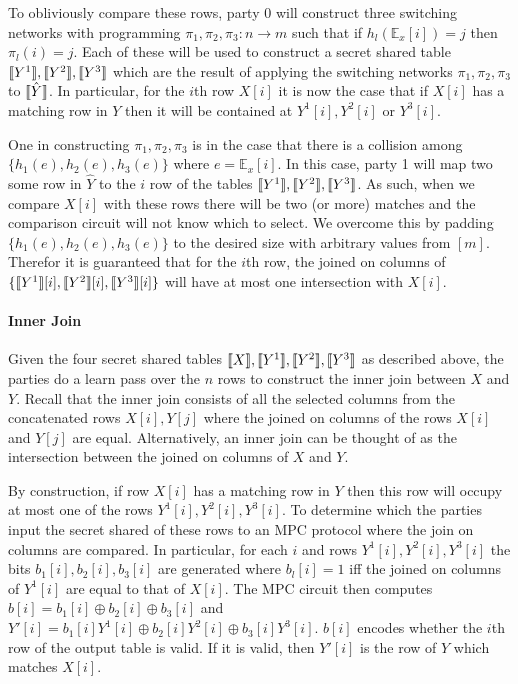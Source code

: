 To obliviously compare these rows, party 0 will construct three switching networks with programming $\pi_1,\pi_2,\pi_3 : n\rightarrow m$ such that if $h_l(\mathbb{E}_x[i])=j$ then $\pi_l(i)=j$. Each of these will be used to construct a secret shared table $\llbracket Y^1\rrbracket,\llbracket Y^2\rrbracket,\llbracket Y^3\rrbracket$ which are the result of applying the switching networks $\pi_1,\pi_2,\pi_3$ to $\llbracket \hat Y\rrbracket$. In particular, for the $i$th row $X[i]$ it is now the case that if $X[i]$ has a matching row in $Y$ then it will be contained at  $Y^1[i],Y^2[i]$ or ${Y^3}[i]$. 

One in constructing $\pi_1,\pi_2,\pi_3$ is in the case that there is a collision among $\{h_1(e),h_2(e), h_3(e)\}$ where $e= \mathbb{E}_x[i]$. In this case, party 1 will map two some row in $\hat Y$ to the $i$ row of the tables $\llbracket Y^1\rrbracket,\llbracket Y^2\rrbracket,\llbracket Y^3\rrbracket$. As such, when we compare $X[i]$ with these rows there will be two (or more) matches and the comparison circuit will not know which to select. We overcome this by padding $\{h_1(e),h_2(e), h_3(e)\}$ to the desired size with arbitrary values from $[m]$. Therefor it is guaranteed that for the $i$th row, the joined on columns of $\{\llbracket Y^1\rrbracket[i],\llbracket Y^2\rrbracket[i],\llbracket Y^3\rrbracket[i]\}$ will  have at most one intersection with $X[i]$.


\paragraph{Inner Join}


Given the four secret shared tables $\llbracket X\rrbracket,\llbracket Y^1\rrbracket,\llbracket Y^2\rrbracket,\llbracket Y^3\rrbracket$ as described above, the parties do a learn pass over the $n$ rows to construct the inner join between $X$ and $Y$. Recall that the inner join consists of all the selected columns from the concatenated rows $X[i],Y[j]$ where  the joined on columns of the rows $X[i]$ and $Y[j]$ are equal. Alternatively, an inner join can be thought of as the intersection between the joined on columns of $X$ and $Y$. 

By construction, if row $X[i]$ has a matching row in $Y$ then this row will occupy at most one of the rows ${Y^1}[i],{Y^2}[i],{Y^3}[i]$. To determine which the parties input the secret shared of these rows to an MPC protocol where the join on columns are compared. In particular, for each $i$ and rows ${Y^1}[i],{Y^2}[i],{Y^3}[i]$ the bits $b_1[i],b_2[i],b_3[i]$ are generated where $b_l[i]=1$ iff the joined on columns of ${Y^1}[i]$ are equal to that of $X[i]$. The MPC circuit then computes $b[i]=b_1[i]\oplus b_2[i]\oplus b_3[i]$ and $Y'[i]=b_1[i]{Y^1}[i]\oplus b_2[i]{Y^2}[i]\oplus b_3[i]{Y^3}[i]$. $b[i]$ encodes whether the $i$th row of the output table is valid. If it is valid, then $Y'[i]$ is the row of $Y$ which matches $X[i]$.

